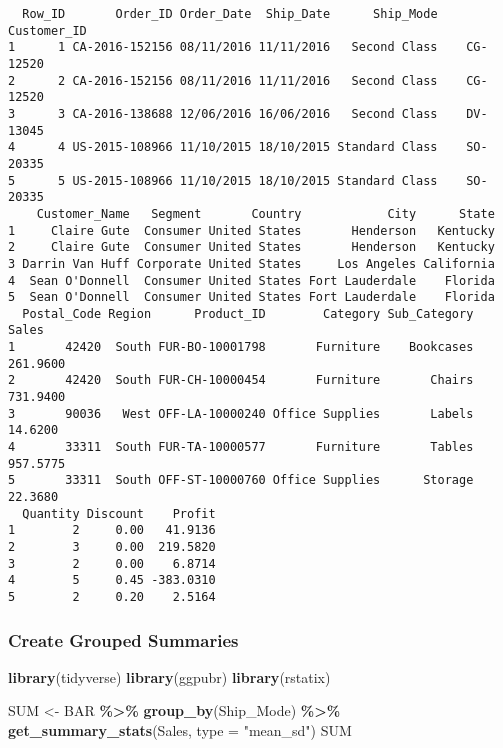 \documentclass[
]{article}
\newenvironment{Shaded}{\begin{snugshade}}{\end{snugshade}}
\newcommand{\AttributeTok}[1]{\textcolor[rgb]{0.13,0.29,0.53}{#1}}
\newcommand{\FunctionTok}[1]{\textcolor[rgb]{0.13,0.29,0.53}{\textbf{#1}}}
\newcommand{\NormalTok}[1]{#1}
\newcommand{\OtherTok}[1]{\textcolor[rgb]{0.56,0.35,0.01}{#1}}
\newcommand{\SpecialCharTok}[1]{\textcolor[rgb]{0.81,0.36,0.00}{\textbf{#1}}}
\newcommand{\StringTok}[1]{\textcolor[rgb]{0.31,0.60,0.02}{#1}}
\begin{document}
\begin{verbatim}
  Row_ID       Order_ID Order_Date  Ship_Date      Ship_Mode Customer_ID
1      1 CA-2016-152156 08/11/2016 11/11/2016   Second Class    CG-12520
2      2 CA-2016-152156 08/11/2016 11/11/2016   Second Class    CG-12520
3      3 CA-2016-138688 12/06/2016 16/06/2016   Second Class    DV-13045
4      4 US-2015-108966 11/10/2015 18/10/2015 Standard Class    SO-20335
5      5 US-2015-108966 11/10/2015 18/10/2015 Standard Class    SO-20335
    Customer_Name   Segment       Country            City      State
1     Claire Gute  Consumer United States       Henderson   Kentucky
2     Claire Gute  Consumer United States       Henderson   Kentucky
3 Darrin Van Huff Corporate United States     Los Angeles California
4  Sean O'Donnell  Consumer United States Fort Lauderdale    Florida
5  Sean O'Donnell  Consumer United States Fort Lauderdale    Florida
  Postal_Code Region      Product_ID        Category Sub_Category    Sales
1       42420  South FUR-BO-10001798       Furniture    Bookcases 261.9600
2       42420  South FUR-CH-10000454       Furniture       Chairs 731.9400
3       90036   West OFF-LA-10000240 Office Supplies       Labels  14.6200
4       33311  South FUR-TA-10000577       Furniture       Tables 957.5775
5       33311  South OFF-ST-10000760 Office Supplies      Storage  22.3680
  Quantity Discount    Profit
1        2     0.00   41.9136
2        3     0.00  219.5820
3        2     0.00    6.8714
4        5     0.45 -383.0310
5        2     0.20    2.5164
\end{verbatim}

\hypertarget{create-grouped-summaries}{%
\subsubsection{Create Grouped
Summaries}\label{create-grouped-summaries}}

\begin{Shaded}
\begin{Highlighting}[]
\FunctionTok{library}\NormalTok{(tidyverse)}
\FunctionTok{library}\NormalTok{(ggpubr)}
\FunctionTok{library}\NormalTok{(rstatix)}

\NormalTok{SUM }\OtherTok{\textless{}{-}}\NormalTok{ BAR }\SpecialCharTok{\%\textgreater{}\%}
  \FunctionTok{group\_by}\NormalTok{(Ship\_Mode) }\SpecialCharTok{\%\textgreater{}\%}
  \FunctionTok{get\_summary\_stats}\NormalTok{(Sales, }\AttributeTok{type =} \StringTok{"mean\_sd"}\NormalTok{)}
\NormalTok{SUM}
\end{Highlighting}
\end{Shaded}
\end{document}
